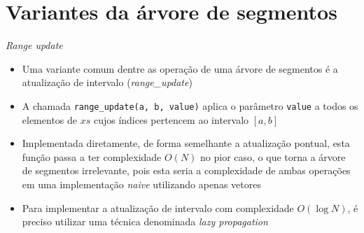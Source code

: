 \section{Variantes da árvore de segmentos}

\begin{frame}[fragile]{\it Range update}

    \begin{itemize}
        \item Uma variante comum dentre as operação de uma árvore de segmentos é a atualização
            de intervalo (\textit{range\_update})

        \item A chamada \texttt{range\_update(a, b, value)} aplica o parâmetro \texttt{value}
            a todos os elementos de $xs$ cujos índices pertencem ao intervalo $[a, b]$

        \item Implementada diretamente, de forma semelhante a atualização pontual, esta função 
            passa a ter complexidade $O(N)$ no pior caso, o que torna a árvore de segmentos 
            irrelevante, pois esta seria a complexidade de ambas operações em uma implementação
            \textit{naive} utilizando apenas vetores

        \item Para implementar a atualização de intervalo com complexidade $O(\log N)$, é 
            preciso utilizar uma técnica denominada \textit{lazy propagation}
    \end{itemize}

\end{frame}

